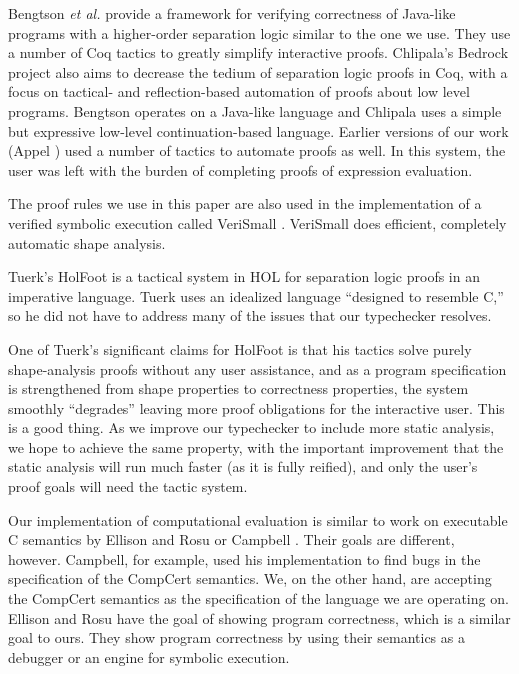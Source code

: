 \documentclass{puthesis}
\begin{document}
Bengtson \emph{et al.} \cite{bengtson12} provide a framework for verifying
correctness of Java-like programs with a higher-order separation logic similar
to the one we use. They use a number of Coq tactics to greatly simplify
interactive proofs. Chlipala's Bedrock project
\cite{chlipala11:pldi} also aims to decrease the tedium of separation logic
proofs in Coq, with a focus on tactical- and reflection-based 
automation of proofs about low level programs. Bengtson operates on a Java-like
language and Chlipala uses a simple but expressive low-level
continuation-based language.
Earlier versions of our
work (Appel \cite{appel06}) used a number of
tactics to automate proofs as well. In this system, the user was left with the
burden of completing proofs of expression evaluation.

The proof rules we use in this paper are also used in the implementation of a
verified symbolic execution called VeriSmall \cite{appel11:verismall}. 
VeriSmall does efficient, completely automatic 
shape analysis.  

Tuerk's HolFoot \cite{Tuer09} is a tactical system in HOL for
separation logic proofs in an imperative language.  Tuerk uses an
idealized language ``designed to resemble C,'' so he did not have to
address many of the issues that our typechecker resolves.

One of Tuerk's significant claims for HolFoot is that his tactics
solve purely shape-analysis proofs without any user assistance, and as
a program specification is strengthened from shape properties to
correctness properties, the system smoothly ``degrades'' leaving more
proof obligations for the interactive user.  This is a good thing.  As
we improve our typechecker to include more static analysis, we hope to
achieve the same property, with the important improvement that the
static analysis will run much faster (as it is fully reified), and
only the user's proof goals will need the tactic system.

Our implementation of computational evaluation is similar to work on
executable C semantics by Ellison and Rosu \cite{ellison-rosu-2012-popl} or
Campbell \cite{Campbell-cpp-12}. Their goals are different, however.
Campbell, for example, used his implementation to find bugs in the
specification of the CompCert semantics. We, on the other hand, are accepting
the CompCert semantics as the specification of the language we are operating
on. Ellison and Rosu have the goal of showing program correctness, which is a 
similar goal to ours. They show program correctness by using their semantics as
a debugger or an engine for symbolic execution.
\end{document}
